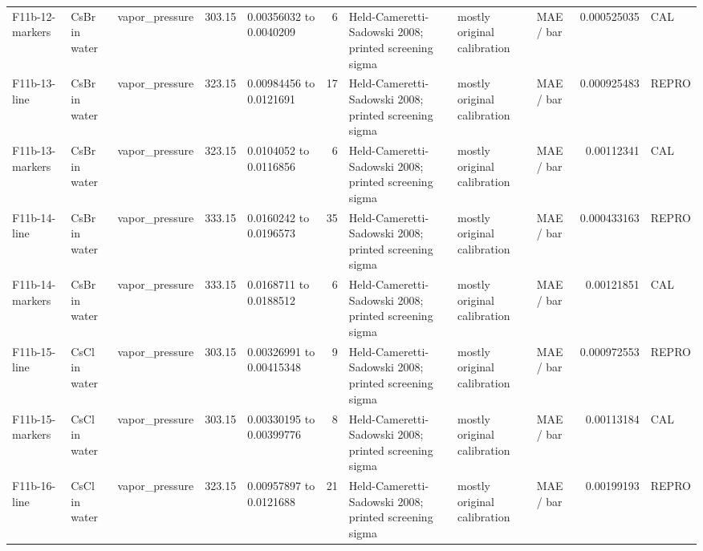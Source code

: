 \begin{landscape}
\begin{longtable}{L{1.9cm}L{2.5cm}L{2.1cm}L{1.6cm}L{1.6cm}rL{2.4cm}L{1.9cm}L{2.2cm}rL{1cm}}
F11b-\allowbreak{}12-\allowbreak{}markers & CsBr in water & vapor\_\allowbreak{}pressure & 303.15 & 0.00356032 to 0.0040209 & 6 & Held-\allowbreak{}Cameretti-\allowbreak{}Sadowski 2008; printed screening sigma & mostly original calibration & MAE /\allowbreak{} bar & 0.000525035 & CAL \\
F11b-\allowbreak{}13-\allowbreak{}line & CsBr in water & vapor\_\allowbreak{}pressure & 323.15 & 0.00984456 to 0.0121691 & 17 & Held-\allowbreak{}Cameretti-\allowbreak{}Sadowski 2008; printed screening sigma & mostly original calibration & MAE /\allowbreak{} bar & 0.000925483 & REPRO \\
F11b-\allowbreak{}13-\allowbreak{}markers & CsBr in water & vapor\_\allowbreak{}pressure & 323.15 & 0.0104052 to 0.0116856 & 6 & Held-\allowbreak{}Cameretti-\allowbreak{}Sadowski 2008; printed screening sigma & mostly original calibration & MAE /\allowbreak{} bar & 0.00112341 & CAL \\
F11b-\allowbreak{}14-\allowbreak{}line & CsBr in water & vapor\_\allowbreak{}pressure & 333.15 & 0.0160242 to 0.0196573 & 35 & Held-\allowbreak{}Cameretti-\allowbreak{}Sadowski 2008; printed screening sigma & mostly original calibration & MAE /\allowbreak{} bar & 0.000433163 & REPRO \\
F11b-\allowbreak{}14-\allowbreak{}markers & CsBr in water & vapor\_\allowbreak{}pressure & 333.15 & 0.0168711 to 0.0188512 & 6 & Held-\allowbreak{}Cameretti-\allowbreak{}Sadowski 2008; printed screening sigma & mostly original calibration & MAE /\allowbreak{} bar & 0.00121851 & CAL \\
F11b-\allowbreak{}15-\allowbreak{}line & CsCl in water & vapor\_\allowbreak{}pressure & 303.15 & 0.00326991 to 0.00415348 & 9 & Held-\allowbreak{}Cameretti-\allowbreak{}Sadowski 2008; printed screening sigma & mostly original calibration & MAE /\allowbreak{} bar & 0.000972553 & REPRO \\
F11b-\allowbreak{}15-\allowbreak{}markers & CsCl in water & vapor\_\allowbreak{}pressure & 303.15 & 0.00330195 to 0.00399776 & 8 & Held-\allowbreak{}Cameretti-\allowbreak{}Sadowski 2008; printed screening sigma & mostly original calibration & MAE /\allowbreak{} bar & 0.00113184 & CAL \\
F11b-\allowbreak{}16-\allowbreak{}line & CsCl in water & vapor\_\allowbreak{}pressure & 323.15 & 0.00957897 to 0.0121688 & 21 & Held-\allowbreak{}Cameretti-\allowbreak{}Sadowski 2008; printed screening sigma & mostly original calibration & MAE /\allowbreak{} bar & 0.00199193 & REPRO \\

\end{longtable}
\end{landscape}
